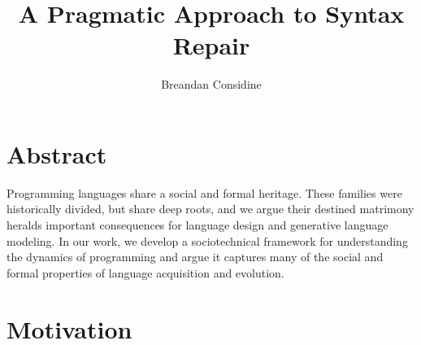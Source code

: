 \documentclass[sigplan,screen]{acmart}
\begin{document}
\title{A Pragmatic Approach to Syntax Repair}

\author{Breandan Considine}

%


\renewcommand{\shortauthors}{Considine}


\maketitle

\section{Abstract}

Programming languages share a social and formal heritage. These families were historically divided, but share deep roots, and we argue their destined matrimony heralds important consequences for language design and generative language modeling. In our work, we develop a sociotechnical framework for understanding the dynamics of programming and argue it captures many of the social and formal properties of language acquisition and evolution.

\section{Motivation}

\end{document}

